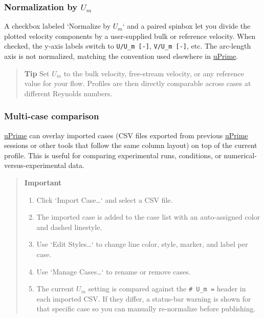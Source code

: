 \subsubsection{Normalization by $U_m$}

A checkbox labeled `Normalize by $U_m$` and a paired spinbox let you divide the plotted velocity components by a user-supplied bulk or reference velocity. When checked, the y-axis labels switch to \texttt{U/U\_m [-]}, \texttt{V/U\_m [-]}, etc. The arc-length axis is not normalized, matching the convention used elsewhere in \href{https://cmdrryder.github.io/uPrime/}{uPrime}.

\begin{quote}
\textbf{Tip}
Set $U_m$ to the bulk velocity, free-stream velocity, or any reference value for your flow. Profiles are then directly comparable across cases at different Reynolds numbers.
\end{quote}

\subsubsection{Multi-case comparison}
\label{sec:meanvel_compare}

\href{https://cmdrryder.github.io/uPrime/}{uPrime} can overlay imported cases (CSV files exported from previous \href{https://cmdrryder.github.io/uPrime/}{uPrime} sessions or other tools that follow the same column layout) on top of the current profile. This is useful for comparing experimental runs, conditions, or numerical-versus-experimental data.

\begin{quote}
\textbf{Important}
\begin{enumerate}[leftmargin=1.5em, topsep=2pt]
  \item Click `Import Case\ldots` and select a CSV file.
  \item The imported case is added to the case list with an auto-assigned color and dashed linestyle.
  \item Use `Edit Styles\ldots` to change line color, style, marker, and label per case.
  \item Use `Manage Cases\ldots` to rename or remove cases.
  \item The current $U_m$ setting is compared against the \texttt{\# U\_m =} header in each imported CSV. If they differ, a status-bar warning is shown for that specific case so you can manually re-normalize before publishing.
\end{enumerate}
\end{quote}

